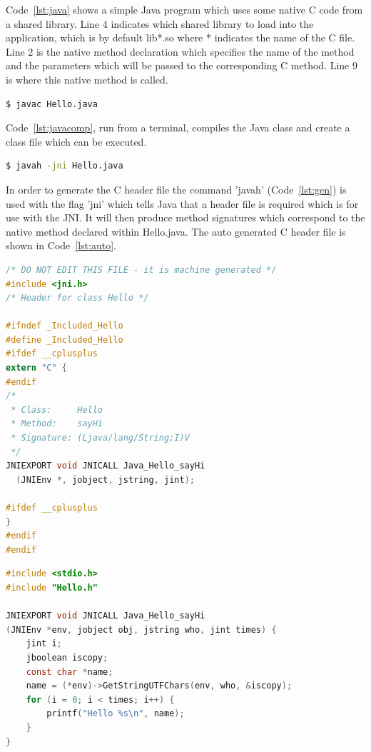 \documentclass[interim_report.tex]{subfiles}
\begin{document}
Code~\ref{lst:java} shows a simple Java program which uses some native C code from a shared library. Line 4 indicates which shared library to load into the application, which is by default lib*.so where * indicates the name of the C file. Line 2 is the native method declaration which specifies the name of the method and the parameters which will be passed to the corresponding C method. Line 9 is where this native method is called.

\begin{lstlisting}[language=sh, caption={Compiling basic Java program}, label=lst:javacomp]
$ javac Hello.java
\end{lstlisting}

Code~\ref{lst:javacomp}, run from a terminal, compiles the Java class and create a class file which can be executed.

\begin{lstlisting}[language=sh, caption={Generating C header file}, label=lst:gen]
$ javah -jni Hello.java
\end{lstlisting}

In order to generate the C header file the command 'javah' (Code~\ref{lst:gen}) is used with the flag 'jni' which tells Java that a header file is required which is for use with the JNI. It will then produce method signatures which correspond to the native method declared within Hello.java. The auto generated C header file is shown in Code~\ref{lst:auto}.

\begin{lstlisting}[language=C, caption={Auto-generated C header file}, label=lst:auto]
/* DO NOT EDIT THIS FILE - it is machine generated */
#include <jni.h>
/* Header for class Hello */

#ifndef _Included_Hello
#define _Included_Hello
#ifdef __cplusplus
extern "C" {
#endif
/*
 * Class:     Hello
 * Method:    sayHi
 * Signature: (Ljava/lang/String;I)V
 */
JNIEXPORT void JNICALL Java_Hello_sayHi
  (JNIEnv *, jobject, jstring, jint);

#ifdef __cplusplus
}
#endif
#endif
\end{lstlisting}

\begin{lstlisting}[language=C, caption={C source file corresponding to auto-generated header file}, label=lst:source]
#include <stdio.h>
#include "Hello.h"

JNIEXPORT void JNICALL Java_Hello_sayHi
(JNIEnv *env, jobject obj, jstring who, jint times) {
    jint i;
    jboolean iscopy;
    const char *name;
    name = (*env)->GetStringUTFChars(env, who, &iscopy);
    for (i = 0; i < times; i++) {
        printf("Hello %s\n", name);
    }
}
\end{lstlisting}
\end{document}
